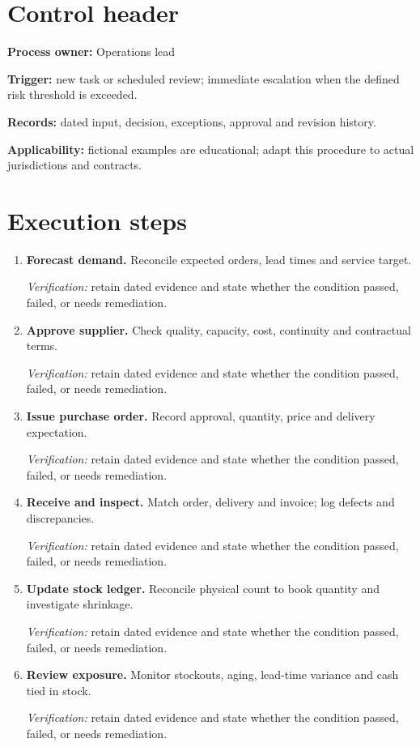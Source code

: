 \documentclass[11pt]{article}
\begin{document}
\SuiteOpen
\section{Control header}
\textbf{Process owner:} Operations lead\par\textbf{Trigger:} new task or scheduled review; immediate escalation when the defined risk threshold is exceeded.\par\textbf{Records:} dated input, decision, exceptions, approval and revision history.\par\textbf{Applicability:} fictional examples are educational; adapt this procedure to actual jurisdictions and contracts.
\section{Execution steps}
\begin{enumerate}[leftmargin=*,itemsep=8pt]
\item \textbf{Forecast demand.} Reconcile expected orders, lead times and service target.\par\textit{Verification:} retain dated evidence and state whether the condition passed, failed, or needs remediation.
\item \textbf{Approve supplier.} Check quality, capacity, cost, continuity and contractual terms.\par\textit{Verification:} retain dated evidence and state whether the condition passed, failed, or needs remediation.
\item \textbf{Issue purchase order.} Record approval, quantity, price and delivery expectation.\par\textit{Verification:} retain dated evidence and state whether the condition passed, failed, or needs remediation.
\item \textbf{Receive and inspect.} Match order, delivery and invoice; log defects and discrepancies.\par\textit{Verification:} retain dated evidence and state whether the condition passed, failed, or needs remediation.
\item \textbf{Update stock ledger.} Reconcile physical count to book quantity and investigate shrinkage.\par\textit{Verification:} retain dated evidence and state whether the condition passed, failed, or needs remediation.
\item \textbf{Review exposure.} Monitor stockouts, aging, lead-time variance and cash tied in stock.\par\textit{Verification:} retain dated evidence and state whether the condition passed, failed, or needs remediation.
\end{enumerate}
\end{document}

